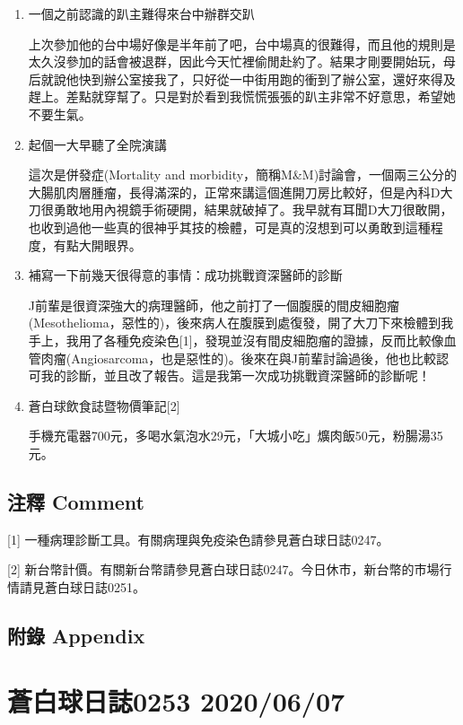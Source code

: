 \documentclass[
]{article}
\begin{document}
\begin{enumerate}
\def\labelenumi{\arabic{enumi}.}
\item
  一個之前認識的趴主難得來台中辦群交趴

  上次參加他的台中場好像是半年前了吧，台中場真的很難得，而且他的規則是太久沒參加的話會被退群，因此今天忙裡偷閒赴約了。結果才剛要開始玩，母后就說他快到辦公室接我了，只好從一中街用跑的衝到了辦公室，還好來得及趕上。差點就穿幫了。只是對於看到我慌慌張張的趴主非常不好意思，希望她不要生氣。
\item
  起個一大早聽了全院演講

  這次是併發症(Mortality and
  morbidity，簡稱M\&M)討論會，一個兩三公分的大腸肌肉層腫瘤，長得滿深的，正常來講這個進開刀房比較好，但是內科D大刀很勇敢地用內視鏡手術硬開，結果就破掉了。我早就有耳聞D大刀很敢開，也收到過他一些真的很神乎其技的檢體，可是真的沒想到可以勇敢到這種程度，有點大開眼界。
\item
  補寫一下前幾天很得意的事情：成功挑戰資深醫師的診斷

  J前輩是很資深強大的病理醫師，他之前打了一個腹膜的間皮細胞瘤(Mesothelioma，惡性的)，後來病人在腹膜到處復發，開了大刀下來檢體到我手上，我用了各種免疫染色{[}1{]}，發現並沒有間皮細胞瘤的證據，反而比較像血管肉瘤(Angiosarcoma，也是惡性的)。後來在與J前輩討論過後，他也比較認可我的診斷，並且改了報告。這是我第一次成功挑戰資深醫師的診斷呢！
\item
  蒼白球飲食誌暨物價筆記{[}2{]}

  手機充電器700元，多喝水氣泡水29元，「大城小吃」爌肉飯50元，粉腸湯35元。
\end{enumerate}

\hypertarget{ux6ce8ux91cb-comment-5}{%
\subsection{注釋 Comment}\label{ux6ce8ux91cb-comment-5}}

{[}1{]} 一種病理診斷工具。有關病理與免疫染色請參見蒼白球日誌0247。

{[}2{]}
新台幣計價。有關新台幣請參見蒼白球日誌0247。今日休市，新台幣的市場行情請見蒼白球日誌0251。

\hypertarget{ux9644ux9304-appendix-5}{%
\subsection{附錄 Appendix}\label{ux9644ux9304-appendix-5}}

\hypertarget{ux84bcux767dux7403ux65e5ux8a8c0253-20200607}{%
\section{蒼白球日誌0253
2020/06/07}\label{ux84bcux767dux7403ux65e5ux8a8c0253-20200607}}
\end{document}
